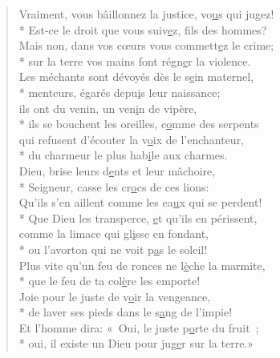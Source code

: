 
\begin{verse}
Vraiment, vous bâillonnez la justice, vo\underline{u}s qui jugez! \\*
Est-ce le droit que vous suiv\underline{e}z, fils des hommes? \\
Mais non, dans vos cœurs vous commett\underline{e}z le crime; \\*
sur la terre vos mains font régn\underline{e}r la violence. \\

Les méchants sont dévoyés dès le s\underline{e}in maternel, \\*
menteurs, égarés depu\underline{i}s leur naissance; \\
ils ont du venin, un ven\underline{i}n de vipère, \\*
ils se bouchent les oreilles, c\underline{o}mme des serpents \\
qui refusent d’écouter la v\underline{o}ix de l’enchanteur, \\*
du charmeur le plus hab\underline{i}le aux charmes. \\

Dieu, brise leurs d\underline{e}nts et leur mâchoire, \\*
Seigneur, casse les cr\underline{o}cs de ces lions: \\
Qu’ils s’en aillent comme les ea\underline{u}x qui se perdent! \\*
Que Dieu les transperce, \underline{e}t qu’ils en périssent, \\
comme la limace qui gl\underline{i}sse en fondant, \\*
ou l’avorton qui ne voit p\underline{a}s le soleil! \\

Plus vite qu’un feu de ronces ne l\underline{è}che la marmite, \\*
que le feu de ta col\underline{è}re les emporte! \\
Joie pour le juste de v\underline{o}ir la vengeance, \\*
de laver ses pieds dans le s\underline{a}ng de l’impie! \\
Et l’homme dira: « Oui, le juste p\underline{o}rte du fruit ; \\*
oui, il existe un Dieu pour jug\underline{e}r sur la terre.» \\
\end{verse}

